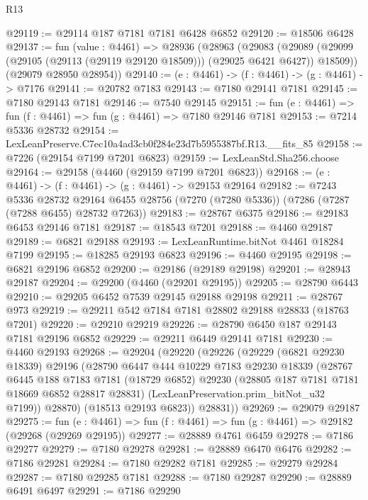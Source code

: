 \begin{lexlean}{R13}
\begin{coremodule}
@29119 := @29114 @187 @7181 @7181 @6428 @6852
@29120 := @18506 @6428
@29137 := fun (value : @4461) =>
  @28936
    (@28963
      (@29083
        (@29089 (@29099 (@29105 (@29113 (@29119 @29120 @18509))) (@29025 @6421 @6427)) @18509))
      (@29079 @28950 @28954))
@29140 := (e : @4461) -> (f : @4461) -> (g : @4461) -> @7176
@29141 := @20782 @7183
@29143 := @7180 @29141 @7181
@29145 := @7180 @29143 @7181
@29146 := @7540 @29145
@29151 := fun (e : @4461) => fun (f : @4461) => fun (g : @4461) => @7180 @29146 @7181
@29153 := @7214 @5336 @28732
@29154 := LexLeanPreserve.C7ec10a4ad3cb0f284e23d7b5955387bf.R13.__fits_85
@29158 := @7226 (@29154 @7199 @7201 @6823)
@29159 := LexLeanStd.Sha256.choose
@29164 := @29158 (@4460 (@29159 @7199 @7201 @6823))
@29168 := (e : @4461) -> (f : @4461) -> (g : @4461) -> @29153 @29164
@29182 := @7243
    @5336
    @28732
    @29164
    @6455
    @28756
    (@7270 (@7280 @5336))
    (@7286 (@7287 (@7288 @6455) @28732 @7263))
@29183 := @28767 @6375
@29186 := @29183 @6453 @29146 @7181
@29187 := @18543 @7201
@29188 := @4460 @29187
@29189 := @6821 @29188
@29193 := LexLeanRuntime.bitNot @4461 @18284 @7199
@29195 := @18285 @29193 @6823
@29196 := @4460 @29195
@29198 := @6821 @29196 @6852
@29200 := @29186 (@29189 @29198)
@29201 := @28943 @29187
@29204 := @29200 (@4460 (@29201 @29195))
@29205 := @28790 @6443
@29210 := @29205 @6452 @7539 @29145 @29188 @29198
@29211 := @28767 @973
@29219 := @29211 @542 @7184 @7181 @28802 @29188 @28833 (@18763 @7201)
@29220 := @29210 @29219
@29226 := @28790 @6450 @187 @29143 @7181 @29196 @6852
@29229 := @29211 @6449 @29141 @7181
@29230 := @4460 @29193
@29268 := @29204
    (@29220
      (@29226
        (@29229
          (@6821 @29230 @18339)
          @29196
          (@28790
            @6447
            @444
            @10229
            @7183
            @29230
            @18339
            (@28767
              @6445
              @188
              @7183
              @7181
              (@18729 @6852)
              @29230
              (@28805 @187 @7181 @7181 @18669 @6852 @28817 @28831)
              (LexLeanPreservation.prim_bitNot_u32 @7199))
            @28870)
          (@18513 @29193 @6823))
        @28831))
@29269 := @29079 @29187
@29275 := fun (e : @4461) => fun (f : @4461) => fun (g : @4461) => @29182 (@29268 (@29269 @29195))
@29277 := @28889 @4761 @6459
@29278 := @7186 @29277
@29279 := @7180 @29278
@29281 := @28889 @6470 @6476
@29282 := @7186 @29281
@29284 := @7180 @29282 @7181
@29285 := @29279 @29284
@29287 := @7180 @29285 @7181
@29288 := @7180 @29287
@29290 := @28889 @6491 @6497
@29291 := @7186 @29290

\end{coremodule}
\end{lexlean}
